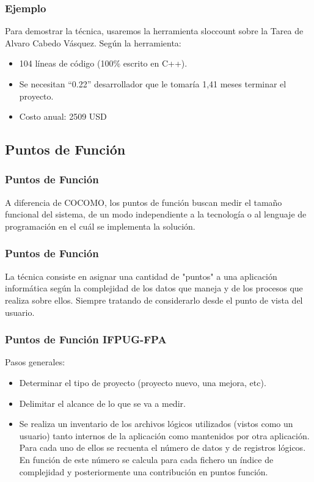 \documentclass[12pt]{beamer}
\begin{document}
\begin{frame}
 \frametitle{Ejemplo}
 Para demostrar la técnica, usaremos la herramienta \alert{sloccount} sobre la Tarea de Alvaro Cabedo Vásquez. Según la herramienta:
    \begin{itemize}
     \item<2-> 104 líneas de código (100\% escrito en C++).
     \item<3-> Se necesitan ``0.22'' desarrollador que le tomaría 1,41 meses terminar el proyecto.
     \item<3-> Costo anual: 2509 USD
    \end{itemize}
\end{frame}

\subsection{Puntos de Función}

\begin{frame}
 \frametitle{Puntos de Función}
 A diferencia de COCOMO, los puntos de función buscan medir el tamaño funcional del sistema, de un modo independiente a la tecnología o al lenguaje de programación en el cuál se implementa la solución.
\end{frame}


\begin{frame}
 \frametitle{Puntos de Función}
 La técnica consiste en asignar una cantidad de "puntos" a una aplicación informática según la complejidad de los datos que maneja y de los procesos que realiza sobre ellos. Siempre tratando de considerarlo desde el punto de vista del \alert{usuario}.
\end{frame}

\begin{frame}
 \frametitle{Puntos de Función IFPUG-FPA}
 Pasos generales:
 \begin{itemize}
  \item<2-> Determinar el tipo de proyecto (proyecto nuevo, una mejora, etc).
  \item<3-> Delimitar el alcance de lo que se va a medir.
  \item<4-> Se realiza un inventario de los archivos lógicos utilizados (vistos como un usuario) tanto internos de la aplicación como mantenidos por otra aplicación. Para cada uno de ellos se recuenta el número de datos y de registros lógicos. En función de este número se calcula para cada fichero un índice de complejidad y posteriormente una contribución en puntos función.
 \end{itemize}
\end{frame}
\end{document}
